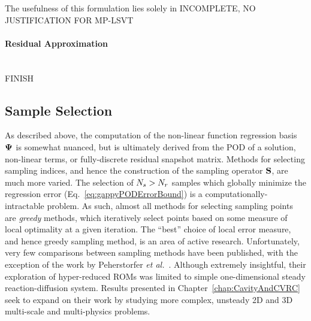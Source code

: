 The usefulness of this formulation lies solely in
{\color{red} INCOMPLETE, NO JUSTIFICATION FOR MP-LSVT}

\paragraph*{Residual Approximation}\mbox{}\\
%
{\color{red} FINISH}

\subsection{Sample Selection}\label{subsec:sampleSelect}

As described above, the computation of the non-linear function regression basis $\deimBasis$ is somewhat nuanced, but is ultimately derived from the POD of a solution, non-linear terms, or fully-discrete residual snapshot matrix. Methods for selecting sampling indices, and hence the construction of the sampling operator $\mathbf{S}$, are much more varied. The selection of $N_s > N_r$ samples which globally minimize the regression error (Eq.~\ref{eq:gappyPODErrorBound}) is a computationally-intractable problem. As such, almost all methods for selecting sampling points are \textit{greedy} methods, which iteratively select points based on some measure of local optimality at a given iteration. The ``best'' choice of local error measure, and hence greedy sampling method, is an area of active research. Unfortunately, very few comparisons between sampling methods have been published, with the exception of the work by Peherstorfer \textit{et al.}~\cite{Peherstorfer2020}. Although extremely insightful, their exploration of hyper-reduced ROMs was limited to simple one-dimensional steady reaction-diffusion system. Results presented in Chapter~\ref{chap:CavityAndCVRC} seek to expand on their work by studying more complex, unsteady 2D and 3D multi-scale and multi-physics problems.

